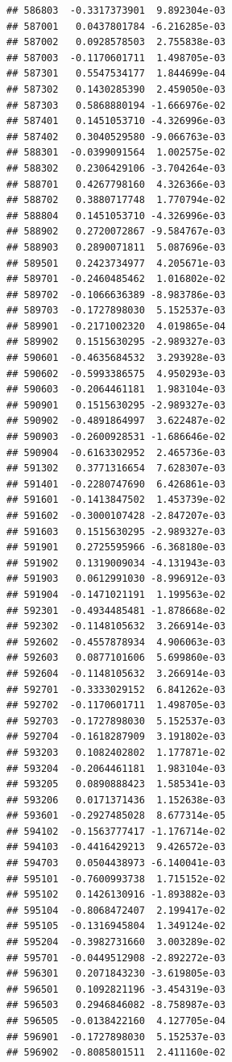 \documentclass[ignorenonframetext,]{beamer}
\begin{document}
\begin{frame}[fragile]
\begin{verbatim}
## 586803  -0.3317373901  9.892304e-03
## 587001   0.0437801784 -6.216285e-03
## 587002   0.0928578503  2.755838e-03
## 587003  -0.1170601711  1.498705e-03
## 587301   0.5547534177  1.844699e-04
## 587302   0.1430285390  2.459050e-03
## 587303   0.5868880194 -1.666976e-02
## 587401   0.1451053710 -4.326996e-03
## 587402   0.3040529580 -9.066763e-03
## 588301  -0.0399091564  1.002575e-02
## 588302   0.2306429106 -3.704264e-03
## 588701   0.4267798160  4.326366e-03
## 588702   0.3880717748  1.770794e-02
## 588804   0.1451053710 -4.326996e-03
## 588902   0.2720072867 -9.584767e-03
## 588903   0.2890071811  5.087696e-03
## 589501   0.2423734977  4.205671e-03
## 589701  -0.2460485462  1.016802e-02
## 589702  -0.1066636389 -8.983786e-03
## 589703  -0.1727898030  5.152537e-03
## 589901  -0.2171002320  4.019865e-04
## 589902   0.1515630295 -2.989327e-03
## 590601  -0.4635684532  3.293928e-03
## 590602  -0.5993386575  4.950293e-03
## 590603  -0.2064461181  1.983104e-03
## 590901   0.1515630295 -2.989327e-03
## 590902  -0.4891864997  3.622487e-02
## 590903  -0.2600928531 -1.686646e-02
## 590904  -0.6163302952  2.465736e-03
## 591302   0.3771316654  7.628307e-03
## 591401  -0.2280747690  6.426861e-03
## 591601  -0.1413847502  1.453739e-02
## 591602  -0.3000107428 -2.847207e-03
## 591603   0.1515630295 -2.989327e-03
## 591901   0.2725595966 -6.368180e-03
## 591902   0.1319009034 -4.131943e-03
## 591903   0.0612991030 -8.996912e-03
## 591904  -0.1471021191  1.199563e-02
## 592301  -0.4934485481 -1.878668e-02
## 592302  -0.1148105632  3.266914e-03
## 592602  -0.4557878934  4.906063e-03
## 592603   0.0877101606  5.699860e-03
## 592604  -0.1148105632  3.266914e-03
## 592701  -0.3333029152  6.841262e-03
## 592702  -0.1170601711  1.498705e-03
## 592703  -0.1727898030  5.152537e-03
## 592704  -0.1618287909  3.191802e-03
## 593203   0.1082402802  1.177871e-02
## 593204  -0.2064461181  1.983104e-03
## 593205   0.0890888423  1.585341e-03
## 593206   0.0171371436  1.152638e-03
## 593601  -0.2927485028  8.677314e-05
## 594102  -0.1563777417 -1.176714e-02
## 594103  -0.4416429213  9.426572e-03
## 594703   0.0504438973 -6.140041e-03
## 595101  -0.7600993738  1.715152e-02
## 595102   0.1426130916 -1.893882e-03
## 595104  -0.8068472407  2.199417e-02
## 595105  -0.1316945804  1.349124e-02
## 595204  -0.3982731660  3.003289e-02
## 595701  -0.0449512908 -2.892272e-03
## 596301   0.2071843230 -3.619805e-03
## 596501   0.1092821196 -3.454319e-03
## 596503   0.2946846082 -8.758987e-03
## 596505  -0.0138422160  4.127705e-04
## 596901  -0.1727898030  5.152537e-03
## 596902  -0.8085801511  2.411160e-02

\end{verbatim}
\end{frame}
\end{document}
